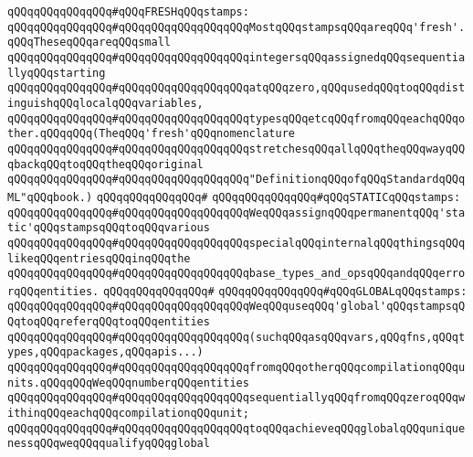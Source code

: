 \newline
\newline
\newline
\verb|qQQqqQQqqQQqqQQq#qQQqFRESHqQQqstamps:|\newline
\verb|qQQqqQQqqQQqqQQq#qQQqqQQqqQQqqQQqqQQqMostqQQqstampsqQQqareqQQq'fresh'.qQQqTheseqQQqareqQQqsmall|\newline
\verb|qQQqqQQqqQQqqQQq#qQQqqQQqqQQqqQQqqQQqintegersqQQqassignedqQQqsequentiallyqQQqstarting|\newline
\verb|qQQqqQQqqQQqqQQq#qQQqqQQqqQQqqQQqqQQqatqQQqzero,qQQqusedqQQqtoqQQqdistinguishqQQqlocalqQQqvariables,|\newline
\verb|qQQqqQQqqQQqqQQq#qQQqqQQqqQQqqQQqqQQqtypesqQQqetcqQQqfromqQQqeachqQQqother.qQQqqQQq(TheqQQq'fresh'qQQqnomenclature|\newline
\verb|qQQqqQQqqQQqqQQq#qQQqqQQqqQQqqQQqqQQqstretchesqQQqallqQQqtheqQQqwayqQQqbackqQQqtoqQQqtheqQQqoriginal|\newline
\verb|qQQqqQQqqQQqqQQq#qQQqqQQqqQQqqQQqqQQq"DefinitionqQQqofqQQqStandardqQQqML"qQQqbook.)|\newline
\verb|qQQqqQQqqQQqqQQq#|\newline
\verb|qQQqqQQqqQQqqQQq#qQQqSTATICqQQqstamps:|\newline
\verb|qQQqqQQqqQQqqQQq#qQQqqQQqqQQqqQQqqQQqWeqQQqassignqQQqpermanentqQQq'static'qQQqstampsqQQqtoqQQqvarious|\newline
\verb|qQQqqQQqqQQqqQQq#qQQqqQQqqQQqqQQqqQQqspecialqQQqinternalqQQqthingsqQQqlikeqQQqentriesqQQqinqQQqthe|\newline
\verb|qQQqqQQqqQQqqQQq#qQQqqQQqqQQqqQQqqQQqbase_types_and_opsqQQqandqQQqerrorqQQqentities.|\newline
\verb|qQQqqQQqqQQqqQQq#|\newline
\verb|qQQqqQQqqQQqqQQq#qQQqGLOBALqQQqstamps:|\newline
\verb|qQQqqQQqqQQqqQQq#qQQqqQQqqQQqqQQqqQQqWeqQQquseqQQq'global'qQQqstampsqQQqtoqQQqreferqQQqtoqQQqentities|\newline
\verb|qQQqqQQqqQQqqQQq#qQQqqQQqqQQqqQQqqQQq(suchqQQqasqQQqvars,qQQqfns,qQQqtypes,qQQqpackages,qQQqapis...)|\newline
\verb|qQQqqQQqqQQqqQQq#qQQqqQQqqQQqqQQqqQQqfromqQQqotherqQQqcompilationqQQqunits.qQQqqQQqWeqQQqnumberqQQqentities|\newline
\verb|qQQqqQQqqQQqqQQq#qQQqqQQqqQQqqQQqqQQqsequentiallyqQQqfromqQQqzeroqQQqwithinqQQqeachqQQqcompilationqQQqunit;|\newline
\verb|qQQqqQQqqQQqqQQq#qQQqqQQqqQQqqQQqqQQqtoqQQqachieveqQQqglobalqQQquniquenessqQQqweqQQqqualifyqQQqglobal|\newline

